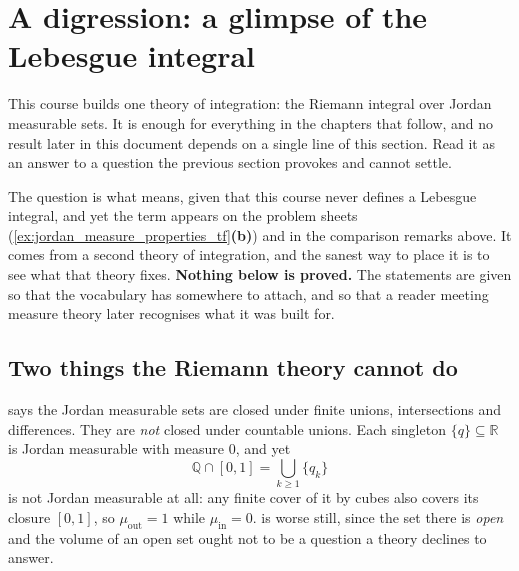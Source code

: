 
\section{A digression: a glimpse of the Lebesgue integral}
\label{sec:lebesgue_digression}

This course builds one theory of integration: the Riemann integral over Jordan measurable sets. It
is enough for everything in the chapters that follow, and no result later in this document depends
on a single line of this section. Read it as an answer to a question the previous section provokes
and cannot settle.

The question is what  means, given that this course never defines a Lebesgue
integral, and yet the term appears on the problem sheets (\cref{ex:jordan_measure_properties_tf}\textbf{(b)}) and in the
comparison remarks above. It comes from a second theory of integration, and the sanest way to place
it is to see what that theory fixes. \textbf{Nothing below is proved.} The statements are given so
that the vocabulary has somewhere to attach, and so that a reader meeting measure theory later
recognises what it was built for.

\subsection{Two things the Riemann theory cannot do}

\begin{example}
\label{ex:lebesgue_defect_sets}
 says the Jordan measurable sets are closed under finite
unions, intersections and differences. They are \emph{not} closed under countable unions. Each
singleton $\{q\} \subseteq \mathbb{R}$ is Jordan measurable with measure $0$, and yet
\[\mathbb{Q}\cap[0,1] = \bigcup_{k\ge1}\{q_k\}\]
is not Jordan measurable at all: any finite cover of it by cubes also covers its closure $[0,1]$,
so $\mu_{\mathrm{out}} = 1$ while $\mu_{\mathrm{in}} = 0$. 
is worse still, since the set there is \emph{open} and the volume of an open set ought not to be a
question a theory declines to answer.
\end{example}

